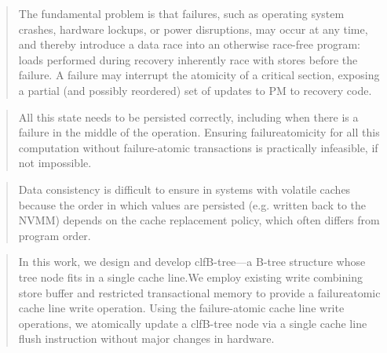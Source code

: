 \begin{quotation}
    The fundamental problem is that failures, such as
    operating system crashes, hardware lockups, or power disruptions,
    may occur at any time, and thereby introduce a data race into an
    otherwise race-free program: loads performed during recovery inherently
    race with stores before the failure. A failure may interrupt
    the atomicity of a critical section, exposing a partial (and possibly
    reordered) set of updates to PM to recovery code.\cite{Kolli:2017:LP:3140659.3080229}
\end{quotation}

\begin{quotation}
    All this state
needs to be persisted correctly, including when there is a
failure in the middle of the operation. Ensuring failureatomicity
for all this computation without failure-atomic
transactions is practically infeasible, if not impossible.\cite{marathe2017persistent}
\end{quotation}

\begin{quotation}
    Data consistency is difficult to ensure in systems with volatile caches
because the order in which values are persisted (e.g. written back to
the NVMM) depends on the cache replacement policy, which often
differs from program order.\cite{shin2017proteus}
\end{quotation}

\begin{quotation}
    In this work, we design and develop clfB-tree—a B-tree structure whose tree node fits in a single cache
line.We employ existing write combining store buffer and restricted transactional memory to provide a failureatomic
cache line write operation. Using the failure-atomic cache line write operations, we atomically update
a clfB-tree node via a single cache line flush instruction without major changes in hardware.\cite{kim2018clfb}
\end{quotation}

